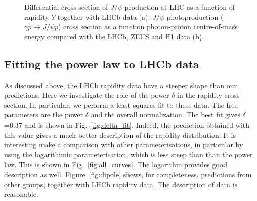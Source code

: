 \documentclass[12pt]{article}
\begin{document}
\begin{figure}[!h]
  \centering
  \caption{Differential cross section of $J/\psi$ production at LHC as a function of rapidity $Y$ together with LHCb data (a). $J/\psi$ photoproduction ($\gamma p \to J/\psi p$) cross section as a function photon-proton centre-of-mass energy compared
           with the LHCb, ZEUS and H1 data (b).}
\end{figure}

\subsection{Fitting the power law to LHCb data}

As discussed above, the LHCb rapidity data have a steeper shape than our predictions.
Here we investigate the role of the power $\delta$ in the rapidity cross section.
In particular, we perform a least-squares fit to these data.
The free parameters are the power $\delta$ and the overall normalization.
The best fit gives $\delta$=0.37 and is shown in Fig.~\ref{fig:delta_fit}.
Indeed, the prediction  obtained with this value gives a much better description of the rapidity distribution.
It is interesting make a comparison with other parameterisations, in particular by using the
logarithimic parameterisation, which is less steep than than the power law.
This is shown  in Fig.~\ref{fig:all_curves}. The logarithm provides good description as well.
Figure~\ref{fig:dipole} shows, for completeness, predictions from other groups, together with LHCb rapidity data.
The description of data is reasonable.
\end{document}
